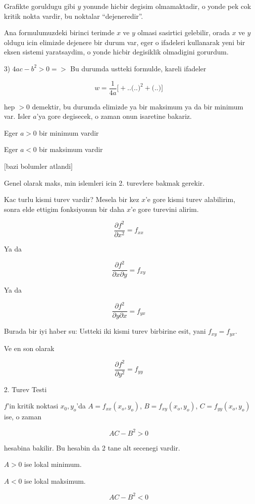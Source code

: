 \documentclass[12pt,fleqn]{article}\usepackage{../common}
\begin{document}
Grafikte goruldugu gibi $y$ yonunde hicbir degisim olmamaktadir, o yonde
pek cok kritik nokta vardir, bu noktalar ``dejeneredir''. 

Ana formulumuzdeki birinci terimde $x$ ve $y$ olmasi sasirtici gelebilir,
orada $x$ ve $y$ oldugu icin elimizde dejenere bir durum var, eger o
ifadeleri kullanarak yeni bir eksen sistemi yaratsaydim, o yonde hicbir
degisiklik olmadigini gorurdum.

3) $4ac - b^2 > 0 => $ Bu durumda ustteki formulde, kareli ifadeler 

\[w = \frac{1}{4a} 
\bigg[
+ .. \bigg( .. \bigg)^2 +
\bigg( .. \bigg)
\bigg]
\]

hep $>0$ demektir, bu durumda elimizde ya bir maksimum ya da bir minimum
var. Isler $a$'ya gore degisecek, o zaman onun isaretine bakariz. 

Eger $a > 0$ bir minimum vardir

Eger $a < 0$ bir maksimum vardir

[bazi bolumler atlandi]

Genel olarak maks, min islemleri icin 2. turevlere bakmak gerekir. 

Kac turlu kismi turev vardir? Mesela bir kez $x$'e gore kismi turev alabilirim,
sonra elde ettigim fonksiyonun bir daha $x$'e gore turevini alirim. 

\[ \frac{\partial f^2}{\partial x^2} = f_{xx}\]

Ya da

\[ 
\frac{\partial f^2}{\partial x \partial y} = f_{xy}
 \]

Ya da 

\[ 
\frac{\partial f^2}{\partial y \partial x} = f_{yx}
 \]

Burada bir iyi haber su: Ustteki iki kismi turev birbirine esit, yani
$f_{xy} = f_{yx}$.

Ve en son olarak

\[ \frac{\partial f^2}{\partial y^2} = f_{yy}\]

2. Turev Testi

$f$'in kritik noktasi $x_0,y_o$'da $A = f_{xx}(x_o,y_o)$, $B =
f_{xy}(x_o,y_o)$, 
$C = f_{yy}(x_o,y_o)$ ise, o zaman 

\[ AC - B^2 > 0 \]

hesabina bakilir. Bu hesabin da 2 tane alt secenegi vardir. 

$A > 0$ ise lokal minimum. 

$A < 0$ ise lokal maksimum. 

\[ AC - B^2 < 0 \]
\end{document}
